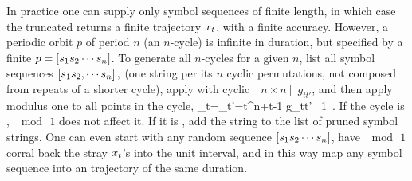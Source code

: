 \medskip

In practice one can supply only symbol sequences of finite length, in which
case the truncated  returns a finite trajectory $x_{t}$, with a
finite accuracy. However, a periodic orbit $p$ of period $n$ (an $n$-cycle)
is infinite in duration, but specified by a finite {\admissible} {\brick}
     \(p=[{s_{1}}{s_{2}}\cdots {\ensuremath{s_{n}}}]\). %
To generate all {\admissible} $n$-cycles for a given $n$, list all {\orbit}
symbol sequences
      \([{s_{1}}{s_{2}},\cdots {\ensuremath{s_{n}}}]\,,\) %
(one string per its $n$ cyclic permutations, not composed from
repeats of a shorter cycle),
apply  with cyclic $[n\!\times\!n]$ $g_{tt'}$, and then apply
modulus one to all points in the cycle,
\beq
  \ssp_{t}=\sum_{t'=t}^{n+t-1} g_{tt'} 
       \quad \mod \, 1
\,.
If the cycle is {\admissible}, $\mod \, 1$ does not affect it. If it is
{\inadmissible}, add the string to the list of pruned symbol strings.
One can even start with any random sequence
      \([{s_{1}}{s_{2}}\cdots {\ensuremath{s_{n}}}]\),
have $\mod \, 1$ corral back the stray $x_{t}$'s into the unit interval, and
in this way map any {\inadmissible} symbol sequence into an {\admissible}
trajectory of the same duration.
